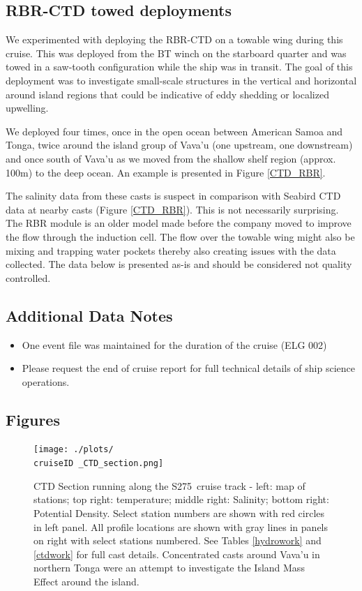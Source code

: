 \documentclass[letterpaper,11pt]{article}
\newcommand{\cruiseID}{S275}
\begin{document}
\subsection*{RBR-CTD towed deployments}

We experimented with deploying the RBR-CTD on a towable wing during this cruise. This was deployed from the BT winch on the starboard quarter and was towed in a saw-tooth configuration while the ship was in transit. The goal of this deployment was to investigate small-scale structures in the vertical and horizontal around island regions that could be indicative of eddy shedding or localized upwelling.

We deployed four times, once in the open ocean between American Samoa and Tonga, twice around the island group of Vava'u (one upstream, one downstream) and once south of Vava'u as we moved from the shallow shelf region (approx. 100m) to the deep ocean. An example is presented in Figure \ref{CTD_RBR}.

The salinity data from these casts is suspect in comparison with Seabird CTD data at nearby casts (Figure \ref{CTD_RBR}). This is not necessarily surprising. The RBR module is an older model made before the company moved to improve the flow through the induction cell. The flow over the towable wing might also be mixing and trapping water pockets thereby also creating issues with the data collected. The data below is presented as-is and should be considered not quality controlled.

\subsection*{Additional Data Notes}

\begin{itemize}
 \item One event file was maintained for the duration of the cruise (ELG 002)
 \item Please request the end of cruise report for full technical details of ship science operations.
\end{itemize}


\clearpage
\subsection*{Figures}

\begin{figure}[h]
\centering
\texttt{[image: ./plots/\\cruiseID \_CTD\_section.png]}
\caption[CTD Section running along the \cruiseID\ cruise track]{CTD Section running along the \cruiseID\ cruise track - left: map of stations; top right: temperature; middle right: Salinity; bottom right: Potential Density. Select station numbers are shown with red circles in left panel. All profile locations are shown with gray lines in panels on right with select stations numbered. See Tables \ref{hydrowork} and \ref{ctdwork} for full cast details. Concentrated casts around Vava'u in northern Tonga were an attempt to investigate the Island Mass Effect around the island.}
\label{CTD_section}
\end{figure}
\end{document}

